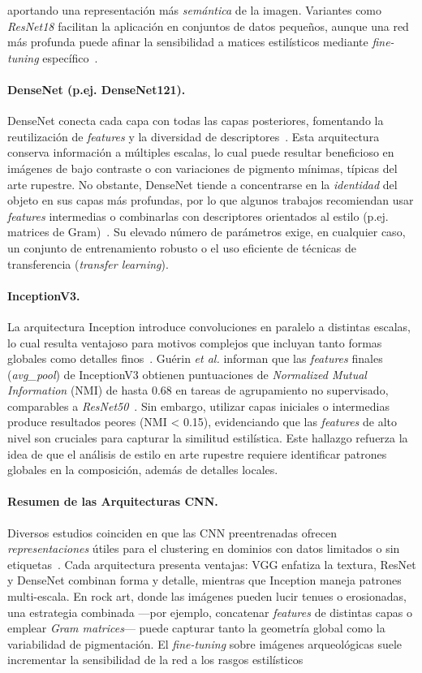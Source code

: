 aportando una representación más \textit{semántica} de la imagen. Variantes como \textit{ResNet18} facilitan la aplicación en conjuntos de datos pequeños, aunque una red más profunda puede afinar la sensibilidad a matices estilísticos mediante \textit{fine-tuning} específico~\cite{gairola2020}. \paragraph{DenseNet (p.ej. DenseNet121).} DenseNet conecta cada capa con todas las capas posteriores, fomentando la reutilización de \textit{features} y la diversidad de descriptores~\cite{dangeti2024}. Esta arquitectura conserva información a múltiples escalas, lo cual puede resultar beneficioso en imágenes de bajo contraste o con variaciones de pigmento mínimas, típicas del arte rupestre. No obstante, DenseNet tiende a concentrarse en la \textit{identidad} del objeto en sus capas más profundas, por lo que algunos trabajos recomiendan usar \textit{features} intermedias o combinarlas con descriptores orientados al estilo (p.ej. matrices de Gram)~\cite{dangeti2024}. Su elevado número de parámetros exige, en cualquier caso, un conjunto de entrenamiento robusto o el uso eficiente de técnicas de transferencia (\textit{transfer learning}). \paragraph{InceptionV3.} La arquitectura Inception introduce convoluciones en paralelo a distintas escalas, lo cual resulta ventajoso para motivos complejos que incluyan tanto formas globales como detalles finos~\cite{guerin2018}. Guérin \textit{et al.} informan que las \textit{features} finales (\textit{avg\_pool}) de InceptionV3 obtienen puntuaciones de \textit{Normalized Mutual Information} (NMI) de hasta 0.68 en tareas de agrupamiento no supervisado, comparables a \textit{ResNet50}~\cite{guerin2018}. Sin embargo, utilizar capas iniciales o intermedias produce resultados peores (NMI < 0.15), evidenciando que las \textit{features} de alto nivel son cruciales para capturar la similitud estilística. Este hallazgo refuerza la idea de que el análisis de estilo en arte rupestre requiere identificar patrones globales en la composición, además de detalles locales. \paragraph{Resumen de las Arquitecturas CNN.} Diversos estudios coinciden en que las CNN preentrenadas ofrecen \textit{representaciones} útiles para el clustering en dominios con datos limitados o sin etiquetas~\cite{guerin2018,gairola2020}. Cada arquitectura presenta ventajas: VGG enfatiza la textura, ResNet y DenseNet combinan forma y detalle, mientras que Inception maneja patrones multi-escala. En rock art, donde las imágenes pueden lucir tenues o erosionadas, una estrategia combinada —por ejemplo, concatenar \textit{features} de distintas capas o emplear \textit{Gram matrices}— puede capturar tanto la geometría global como la variabilidad de pigmentación. El \textit{fine-tuning} sobre imágenes arqueológicas suele incrementar la sensibilidad de la red a los rasgos estilísticos 